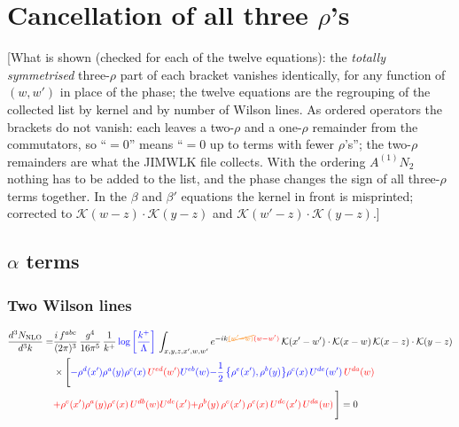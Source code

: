 \documentclass[9pt]{article}
\numberwithin{equation}{section}
\begin{document}
\section{Cancellation of all three $\rho$'s} {\color{red}[What is shown (checked for each of the twelve equations): the \emph{totally symmetrised} three-$\rho$ part of each bracket vanishes identically, for any function of $(w,w')$ in place of the phase; the twelve equations are the regrouping of the collected list by kernel and by number of Wilson lines. As ordered operators the brackets do not vanish: each leaves a two-$\rho$ and a one-$\rho$ remainder from the commutators, so ``$=0$'' means ``$=0$ up to terms with fewer $\rho$'s''; the two-$\rho$ remainders are what the JIMWLK file collects. With the ordering $A^{(1)}N_{2}$ nothing has to be added to the list, and the phase changes the sign of all three-$\rho$ terms together. In the $\beta$ and $\beta'$ equations the kernel in front is misprinted; corrected to $\mathcal{K}(w-z)\cdot\mathcal{K}(y-z)$ and $\mathcal{K}(w'-z)\cdot\mathcal{K}(y-z)$.]}
\subsection{$\alpha$ terms}
\subsubsection{Two Wilson lines}
\begin{align}
\frac{d^{3}N_{\rm NLO}}{d^{3}k}= & \frac{i\,f^{abc}}{(2\pi)^{3}}\,\frac{g^{4}}{16\pi^{5}}\,\frac{1}{k^{+}}\,{\color{blue}\log{\left[\frac{k^{+}}{\Lambda}\right]}}\,\int_{x,y,z,x',w,w'}e^{-ik{\color{orange}\cancel{(w'-w)}}{\color{red}(w-w')}}\,\mathcal{K}(x'-w')\cdot\mathcal{K}(x-w)\,\mathcal{K}(x-z)\cdot\mathcal{K}(y-z)\notag\\
&\times\Bigg[{\color{blue}-\rho^{d}(x') \rho^{a}(y) \rho^{c}(x)\,{\color{red}U^{ed}(w')} U^{e b}(w)}{\color{blue}-\frac{1}{2}\,\big\{\rho^{e}(x'),\rho^{b}(y)\big\}\rho^{c}(x)\,U^{de}(w')\,{\color{red}U^{da}(w)}}\notag \\ & {\color{red}+\rho^{e}(x') \rho^{a}(y) \rho^{c}(x)\, U^{d b}(w) {\color{red}U^{de}(x')}}{\color{red}+\rho^{b}(y)\,\rho^{e}(x')\,\rho^{c}(x)\,U^{de}(x')\,{\color{red}U^{da}(w)}}\,\Bigg] = 0
\end{align}
\end{document}
